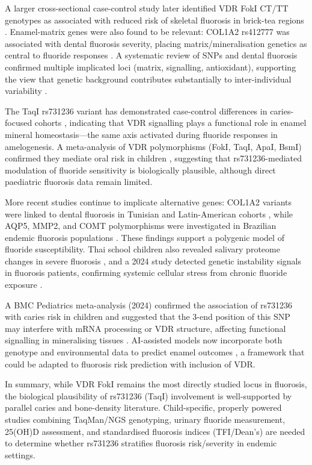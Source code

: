 \documentclass[12pt,a4paper]{article}
\begin{document}
A larger cross-sectional case-control study later identified VDR FokI CT/TT genotypes as
associated with reduced risk of skeletal fluorosis in brick-tea regions \citep{Yang2016}.
Enamel-matrix genes were also found to be relevant: COL1A2 rs412777 was associated with
dental fluorosis severity, placing matrix/mineralisation genetics as central to fluoride responses
\citep{JarquinYneza2018}. A systematic review of SNPs and dental fluorosis confirmed multiple
implicated loci (matrix, signalling, antioxidant), supporting the view that genetic background
contributes substantially to inter-individual variability \citep{GonzalezCasamada2022}.

The TaqI rs731236 variant has demonstrated case-control differences in caries-focused cohorts
\citep{Antunes2016, Lei2021}, indicating that VDR signalling plays a functional role in enamel
mineral homeostasis---the same axis activated during fluoride responses in amelogenesis. A
meta-analysis of VDR polymorphisms (FokI, TaqI, ApaI, BsmI) confirmed they mediate oral
risk in children \citep{Peponis2023}, suggesting that rs731236-mediated modulation of fluoride
sensitivity is biologically plausible, although direct paediatric fluorosis data remain limited.

More recent studies continue to implicate alternative genes: COL1A2 variants were linked to
dental fluorosis in Tunisian and Latin-American cohorts \citep{Kallala2024, JarquinYneza2018},
while AQP5, MMP2, and COMT polymorphisms were investigated in Brazilian endemic fluorosis
populations \citep{deLavor2025}. These findings support a polygenic model of fluoride
susceptibility. Thai school children also revealed salivary proteome changes in severe fluorosis
\citep{Gavila2024}, and a 2024 study detected genetic instability signals in fluorosis patients,
confirming systemic cellular stress from chronic fluoride exposure \citep{Garcia2024}.

A BMC Pediatrics meta-analysis (2024) confirmed the association of rs731236 with caries risk in
children and suggested that the 3-end position of this SNP may interfere with mRNA
processing or VDR structure, affecting functional signalling in mineralising tissues \citep{Qin2024}.
AI-assisted models now incorporate both genotype and environmental data to predict enamel outcomes
\citep{Wei2025}, a framework that could be adapted to fluorosis risk prediction with inclusion of VDR.

In summary, while VDR FokI remains the most directly studied locus in fluorosis, the biological
plausibility of rs731236 (TaqI) involvement is well-supported by parallel caries and bone-density
literature. Child-specific, properly powered studies combining TaqMan/NGS genotyping, urinary
fluoride measurement, 25(OH)D assessment, and standardised fluorosis indices (TFI/Dean's) are
needed to determine whether rs731236 stratifies fluorosis risk/severity in endemic settings.
\end{document}
